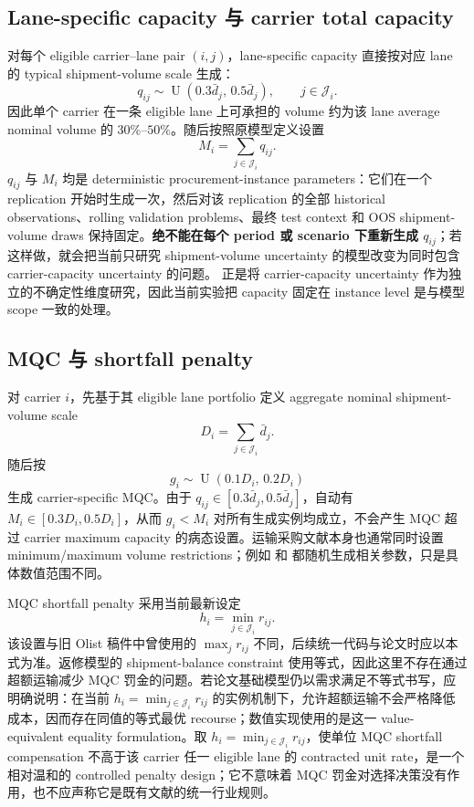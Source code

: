 \documentclass[11pt,a4paper]{ctexart}
\newcommand{\J}{\mathcal J}
\newcommand{\U}{\operatorname{U}}
\begin{document}
\subsection{Lane-specific capacity 与 carrier total capacity}

对每个 eligible carrier--lane pair $(i,j)$，lane-specific capacity 直接按对应 lane 的 typical shipment-volume scale 生成：
\[
q_{ij}\sim \U(0.3\bar d_j,\,0.5\bar d_j),\qquad j\in\J_i.
\]
因此单个 carrier 在一条 eligible lane 上可承担的 volume 约为该 lane average nominal volume 的 $30\%$--$50\%$。随后按照原模型定义设置
\[
M_i=\sum_{j\in\J_i}q_{ij}.
\]
$q_{ij}$ 与 $M_i$ 均是 deterministic procurement-instance parameters：它们在一个 replication 开始时生成一次，然后对该 replication 的全部 historical observations、rolling validation problems、最终 test context 和 OOS shipment-volume draws 保持固定。\textbf{绝不能在每个 period 或 scenario 下重新生成 $q_{ij}$}；若这样做，就会把当前只研究 shipment-volume uncertainty 的模型改变为同时包含 carrier-capacity uncertainty 的问题。\citet{remli2019} 正是将 carrier-capacity uncertainty 作为独立的不确定性维度研究，因此当前实验把 capacity 固定在 instance level 是与模型 scope 一致的处理。

\subsection{MQC 与 shortfall penalty}

对 carrier $i$，先基于其 eligible lane portfolio 定义 aggregate nominal shipment-volume scale
\[
D_i=\sum_{j\in\J_i}\bar d_j.
\]
随后按
\[
g_i\sim \U(0.1D_i,\,0.2D_i)
\]
生成 carrier-specific MQC。由于 $q_{ij}\in[0.3\bar d_j,0.5\bar d_j]$，自动有 $M_i\in[0.3D_i,0.5D_i]$，从而 $g_i<M_i$ 对所有生成实例均成立，不会产生 MQC 超过 carrier maximum capacity 的病态设置。运输采购文献本身也通常同时设置 minimum/maximum volume restrictions；例如 \citet{remli2013} 和 \citet{li2023} 都随机生成相关参数，只是具体数值范围不同。

MQC shortfall penalty 采用当前最新设定
\[
h_i=\min_{j\in\J_i}r_{ij}.
\]
该设置与旧 Olist 稿件中曾使用的 $\max_j r_{ij}$ 不同，后续统一代码与论文时应以本式为准。返修模型的 shipment-balance constraint 使用等式，因此这里不存在通过超额运输减少 MQC 罚金的问题。若论文基础模型仍以需求满足不等式书写，应明确说明：在当前 $h_i=\min_{j\in\J_i}r_{ij}$ 的实例机制下，允许超额运输不会严格降低成本，因而存在同值的等式最优 recourse；数值实现使用的是这一 value-equivalent equality formulation。取 $h_i=\min_{j\in\J_i}r_{ij}$，使单位 MQC shortfall compensation 不高于该 carrier 任一 eligible lane 的 contracted unit rate，是一个相对温和的 controlled penalty design；它不意味着 MQC 罚金对选择决策没有作用，也不应声称它是既有文献的统一行业规则。
\end{document}
